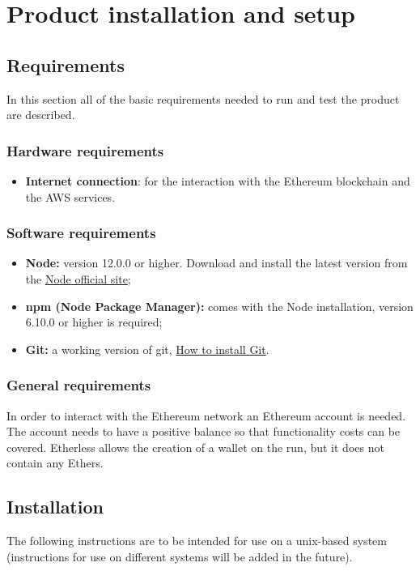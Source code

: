 \section{Product installation and setup}
  \subsection{Requirements}
    In this section all of the basic requirements needed to run and test the product are described.
    \subsubsection{Hardware requirements}
      \begin{itemize}
      	\item \textbf{Internet connection}: for the interaction with the Ethereum blockchain and the AWS services.
      \end{itemize}
    \subsubsection{Software requirements}
      \begin{itemize}
        \item \textbf{Node:} version 12.0.0 or higher. Download and install the latest version from the \href{https://nodejs.org/it/download/}{Node official site};
        \item \textbf{npm (Node Package Manager):} comes with the Node installation, version 6.10.0 or higher is required;
        \item \textbf{Git:} a working version of git, \href{https://git-scm.com/book/en/v2/Getting-Started-Installing-Git}{How to install Git}.
      \end{itemize}
    \subsubsection{General requirements}
      In order to interact with the Ethereum network an Ethereum account is needed. The account needs to have a positive balance so that functionality costs can be covered. Etherless allows the creation of a wallet on the run, but it does not contain any Ethers.
  \subsection{Installation}
    The following instructions are to be intended for use on a unix-based system (instructions for use on different systems will be added in the future).
